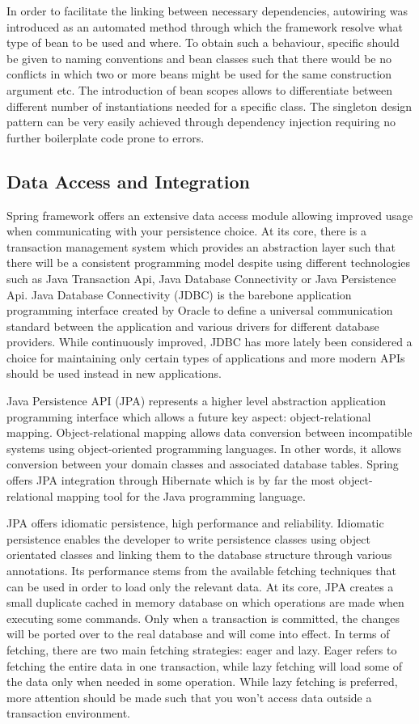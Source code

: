In order to facilitate the linking between necessary dependencies, autowiring was introduced as an automated method through which the framework resolve what type of bean to be used and where. To obtain such a behaviour, specific should be given to naming conventions and bean classes such that there would be no conflicts in which two or more beans might be used for the same construction argument etc. The introduction of bean scopes allows to differentiate between different number of instantiations needed for a specific class. The singleton design pattern can be very easily achieved through dependency injection requiring no further boilerplate code prone to errors.

\subsection*{Data Access and Integration}

Spring framework offers an extensive data access module allowing improved usage when communicating with your persistence choice. At its core, there is a transaction management system which provides an abstraction layer such that there will be a consistent programming model despite using different technologies such as Java Transaction Api, Java Database Connectivity or Java Persistence Api. Java Database Connectivity (JDBC) is the barebone application programming interface created by Oracle to define a universal communication standard between the application and various drivers for different database providers. While continuously improved, JDBC has more lately been considered a choice for maintaining only certain types of applications and more modern APIs should be used instead in new applications.

Java Persistence API (JPA) represents a higher level abstraction application programming interface which allows a future key aspect: object-relational mapping. Object-relational mapping allows data conversion between incompatible systems using object-oriented programming languages. In other words, it allows conversion between your domain classes and associated database tables. Spring offers JPA integration through Hibernate which is by far the most object-relational mapping tool for the Java programming language.

JPA offers idiomatic persistence, high performance and reliability. Idiomatic persistence enables the developer to write persistence classes using object orientated classes and linking them to the database structure through various annotations. Its performance stems from the available fetching techniques that can be used in order to load only the relevant data. At its core, JPA creates a small duplicate cached in memory database on which operations are made when executing some commands. Only when a transaction is committed, the changes will be ported over to the real database and will come into effect. In terms of fetching, there are two main fetching strategies: eager and lazy. Eager refers to fetching the entire data in one transaction, while lazy fetching will load some of the data only when needed in some operation. While lazy fetching is preferred, more attention should be made such that you won't access data outside a transaction environment.

